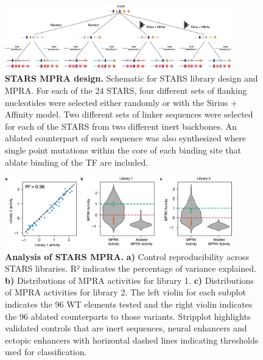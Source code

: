 \begin{figure}[p]
    \centering
    \includegraphics[width=0.88\textwidth]{2_figures-and-files/SuppFig12.png}
    \caption[STARS MPRA design.]{\textbf{STARS MPRA design.} Schematic for STARS library design and MPRA. For each of the 24 STARS, four different sets of flanking nucleotides were selected either randomly or with the Sirius + Affinity model. Two different sets of linker sequences were selected for each of the STARS from two different inert backbones. An ablated counterpart of each sequence was also synthesized where single point mutations within the core of each binding site that ablate binding of the TF are included.}
    \label{fig:supplementary_12}
\end{figure}

\begin{figure}[p]
    \centering
    \includegraphics[width=0.88\textwidth]{2_figures-and-files/SuppFig13.png}
    \caption[Analysis of STARS MPRA.]{\textbf{Analysis of STARS MPRA.} \textbf{a)} Control reproducibility across STARS libraries. R² indicates the percentage of variance explained. \textbf{b)} Distributions of MPRA activities for library 1. \textbf{c)} Distributions of MPRA activities for library 2. The left violin for each subplot indicates the 96 WT elements tested and the right violin indicates the 96 ablated counterparts to those variants. Stripplot highlights validated controls that are inert sequences, neural enhancers and ectopic enhancers with horizontal dashed lines indicating thresholds used for classification.}
    \label{fig:supplementary_13}
\end{figure}

